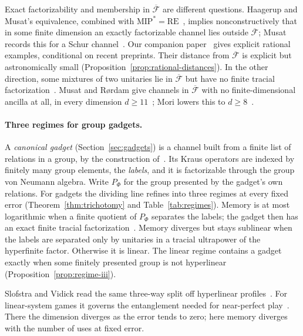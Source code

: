 Exact factorizability and membership in $\overline{\mathcal F}$ are
different questions. Haagerup and Musat's equivalence, combined with
$\mathrm{MIP}^*=\mathrm{RE}$~\cite{JiEtAl2020}, implies nonconstructively
that in some finite dimension an exactly factorizable channel lies
outside $\overline{\mathcal F}$; Musat records this for a Schur
channel~\cite[Corollary~3.11]{Musat2025}. Our companion
paper~\cite{MghirbiDouglasD} gives explicit rational examples, conditional
on recent preprints. Their distance from $\overline{\mathcal F}$ is explicit
but astronomically small (Proposition~\ref{prop:rational-distances}). In the other direction, some
mixtures of two unitaries lie in $\overline{\mathcal F}$ but have no
finite tracial factorization~\cite[Proposition~3.6]{Musat2025}. Musat
and R\o rdam give channels in $\overline{\mathcal F}$ with no
finite-dimensional ancilla at all, in every dimension
$d\geq11$~\cite[Theorem~4.1]{MusatRordam2019}; Mori lowers this to
$d\geq8$~\cite[Theorem~2.5]{Musat2025}.

\paragraph{Three regimes for group gadgets.}
A \emph{canonical gadget} (Section~\ref{sec:gadgets}) is a channel built
from a finite list of relations in a group, by the construction
of~\cite[Section~9]{DouglasMghirbiC}. Its Kraus operators are indexed by
finitely many group elements, the \emph{labels}, and it is factorizable
through the group von Neumann algebra. Write $P_\Phi$ for the group
presented by the gadget's own relations. For gadgets the dividing line
refines into three regimes at every fixed error
(Theorem~\ref{thm:trichotomy} and Table~\ref{tab:regimes}). Memory is at
most logarithmic when a finite quotient of $P_\Phi$ separates the
labels; the gadget then has an exact finite tracial
factorization~\cite[Theorem~8.6]{DouglasMghirbiB}. Memory diverges but
stays sublinear when the labels are separated only by unitaries in a
tracial ultrapower of the hyperfinite factor. Otherwise it is linear.
The linear regime contains a gadget exactly when some finitely presented
group is not hyperlinear (Proposition~\ref{prop:regime-iii}).

Slofstra and Vidick read the same three-way split off hyperlinear
profiles~\cite[Section~2]{SlofstraVidick2018}. For linear-system games
it governs the entanglement needed for near-perfect
play~\cite{CleveLiuSlofstra2017,Slofstra2019,SlofstraVidick2018}. There
the dimension diverges as the error tends to zero; here memory diverges
with the number of uses at fixed error.

